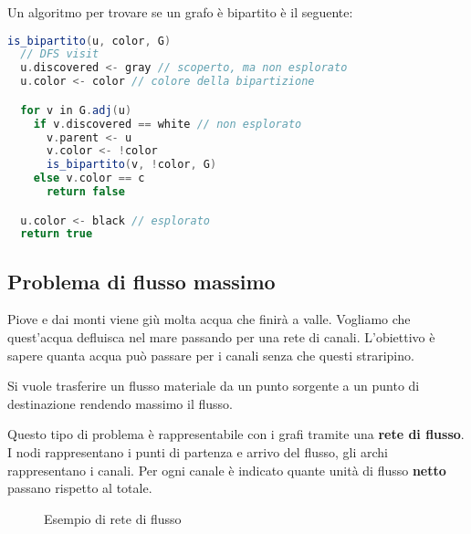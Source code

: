 \documentclass[a4paper]{article}
\begin{document}
\vspace{1em}
\noindent
Un algoritmo per trovare se un grafo è bipartito è il seguente:
\begin{lstlisting}[language=Scala]
is_bipartito(u, color, G)
  // DFS visit
  u.discovered <- gray // scoperto, ma non esplorato
  u.color <- color // colore della bipartizione

  for v in G.adj(u)
    if v.discovered == white // non esplorato
      v.parent <- u
      v.color <- !color
      is_bipartito(v, !color, G)
    else v.color == c
      return false

  u.color <- black // esplorato
  return true
\end{lstlisting}

\subsection{Problema di flusso massimo}
\begin{example}
  Piove e dai monti viene giù molta acqua che finirà a valle. Vogliamo che quest'acqua
  defluisca nel mare passando per una rete di canali. L'obiettivo è sapere quanta acqua
  può passare per i canali senza che questi straripino.

  Si vuole trasferire un flusso materiale da un punto sorgente a un punto di destinazione rendendo
  massimo il flusso.
\end{example}
Questo tipo di problema è rappresentabile con i grafi tramite una \textbf{rete di flusso}.
I nodi rappresentano i punti di partenza e arrivo del flusso, gli archi rappresentano i canali.
Per ogni canale è indicato quante unità di flusso \textbf{netto} passano rispetto al totale.
\begin{figure}[H]
  \centering
  \caption{Esempio di rete di flusso}
\end{figure}
\end{document}
